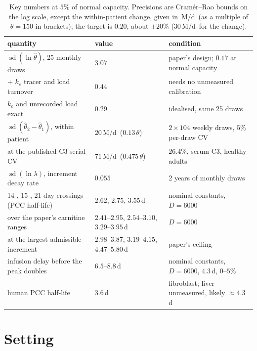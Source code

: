 \documentclass[11pt,a4paper]{article}
\newcommand{\sdl}[1]{\operatorname{sd}(\ln #1)}
\newcommand{\um}{\,\textmu M/d}
\begin{document}
\begin{table}[h]
\centering\footnotesize\setlength{\tabcolsep}{3pt}
\caption{\label{tab:key}Key numbers at $5\%$ of normal capacity. Precisions are
Cram\'er--Rao bounds on the log scale, except the within-patient change, given in \um\ (as a multiple of $\theta=150$ in brackets); the target is $0.20$, about $\pm20\%$ ($30$\um\ for the change).}
\begin{tabular}{@{}lll@{}}
\toprule
quantity & value & condition \\
\midrule
$\sdl{\hat\theta}$, 25 monthly draws & $3.07$ & paper's design; $0.17$ at normal capacity \\
\quad $+$ $k_e$ tracer and load turnover & $0.44$ & needs no unmeasured calibration \\
\quad $k_e$ and unrecorded load exact & $0.29$ & idealised, same 25 draws \\
$\operatorname{sd}(\hat\theta_2-\hat\theta_1)$, within patient & $20$\um\ ($0.13\,\theta$) &
$2\times104$ weekly draws, $5\%$ per-draw CV \\
\quad at the published C3 serial CV & $71$\um\ ($0.475\,\theta$) & $26.4\%$, serum C3, healthy adults \\
$\sdl{\lambda}$, increment decay rate & $0.055$ & 2 years of monthly draws \\
14-, 15-, 21-day crossings (PCC half-life) & $2.62$, $2.75$, $3.55$\,d & nominal constants,
$D=6000$ \\
\quad over the paper's carnitine ranges & $2.41$--$2.95$, $2.54$--$3.10$, $3.29$--$3.95$\,d &
$D=6000$ \\
\quad at the largest admissible increment & $2.98$--$3.87$, $3.19$--$4.15$, $4.47$--$5.80$\,d &
paper's ceiling \\
infusion delay before the peak doubles & $6.5$--$8.8$\,d & nominal constants, $D=6000$, $4.3$\,d, $0$--$5\%$ \\
human PCC half-life & $3.6$\,d & fibroblast; liver unmeasured, likely $\approx4.3$\,d \\
\bottomrule
\end{tabular}
\end{table}

\section{Setting}
\end{document}
